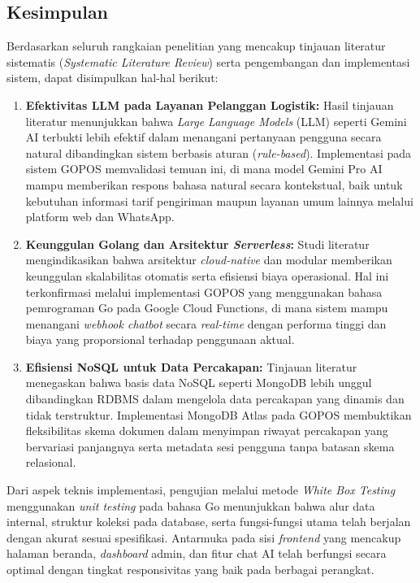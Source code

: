 
\subsection{Kesimpulan}

Berdasarkan seluruh rangkaian penelitian yang mencakup tinjauan literatur sistematis (\textit{Systematic Literature Review}) serta pengembangan dan implementasi sistem, dapat disimpulkan hal-hal berikut:

\begin{enumerate}[leftmargin=*]
    \item \textbf{Efektivitas LLM pada Layanan Pelanggan Logistik:} Hasil tinjauan literatur menunjukkan bahwa \textit{Large Language Models} (LLM) seperti Gemini AI terbukti lebih efektif dalam menangani pertanyaan pengguna secara natural dibandingkan sistem berbasis aturan (\textit{rule-based}). Implementasi pada sistem GOPOS memvalidasi temuan ini, di mana model Gemini Pro AI mampu memberikan respons bahasa natural secara kontekstual, baik untuk kebutuhan informasi tarif pengiriman maupun layanan umum lainnya melalui platform web dan WhatsApp.

    \item \textbf{Keunggulan Golang dan Arsitektur \textit{Serverless}:} Studi literatur mengindikasikan bahwa arsitektur \textit{cloud-native} dan modular memberikan keunggulan skalabilitas otomatis serta efisiensi biaya operasional. Hal ini terkonfirmasi melalui implementasi GOPOS yang menggunakan bahasa pemrograman Go pada Google Cloud Functions, di mana sistem mampu menangani \textit{webhook chatbot} secara \textit{real-time} dengan performa tinggi dan biaya yang proporsional terhadap penggunaan aktual.

    \item \textbf{Efisiensi NoSQL untuk Data Percakapan:} Tinjauan literatur menegaskan bahwa basis data NoSQL seperti MongoDB lebih unggul dibandingkan RDBMS dalam mengelola data percakapan yang dinamis dan tidak terstruktur. Implementasi MongoDB Atlas pada GOPOS membuktikan fleksibilitas skema dokumen dalam menyimpan riwayat percakapan yang bervariasi panjangnya serta metadata sesi pengguna tanpa batasan skema relasional.
\end{enumerate}

Dari aspek teknis implementasi, pengujian melalui metode \textit{White Box Testing} menggunakan \textit{unit testing} pada bahasa Go menunjukkan bahwa alur data internal, struktur koleksi pada database, serta fungsi-fungsi utama telah berjalan dengan akurat sesuai spesifikasi. Antarmuka pada sisi \textit{frontend} yang mencakup halaman beranda, \textit{dashboard} admin, dan fitur chat AI telah berfungsi secara optimal dengan tingkat responsivitas yang baik pada berbagai perangkat.


